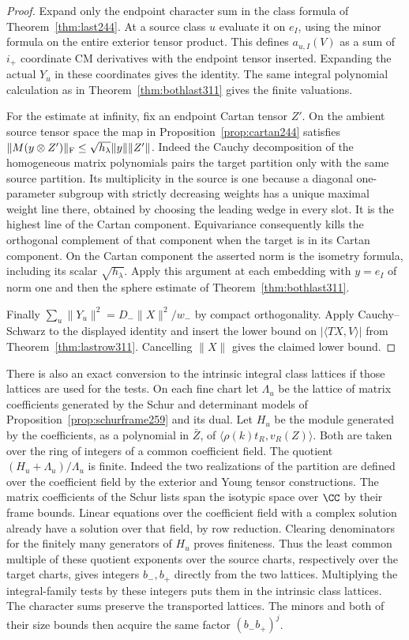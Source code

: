 \documentclass[a4paper,11pt]{article}
\theoremstyle{definition}
\theoremstyle{remark}
\numberwithin{equation}{section}
\begin{document}
\begin{proof}
Expand only the endpoint character sum in the class formula
of Theorem~\ref{thm:last244}. At a source class \(u\) evaluate
it on \(e_I\), using the minor formula on the entire exterior
tensor product. This defines \(a_{u,I}(V)\) as a sum of
\(i_+\) coordinate CM derivatives with the endpoint tensor
inserted. Expanding the actual \(Y_u\) in these coordinates
gives the identity. The same integral polynomial calculation
as in Theorem~\ref{thm:bothlast311} gives the finite valuations.

For the estimate at infinity, fix an endpoint Cartan tensor
\(Z'\). On the ambient source tensor space the map in
Proposition~\ref{prop:cartan244} satisfies
\(\|M(y\otimes Z')\|_{\rm F}\le
\sqrt{h_\lambda}\|y\|\|Z'\|\). Indeed the Cauchy decomposition
of the homogeneous matrix polynomials pairs the target
partition only with the same source partition. Its multiplicity
in the source is one because a diagonal one-parameter subgroup
with strictly decreasing weights
has a unique maximal weight line there, obtained by choosing
the leading wedge in every slot. It is the highest line of
the Cartan component. Equivariance consequently kills the
orthogonal complement of that component when the target is
in its Cartan component. On the Cartan component the asserted
norm is the isometry formula, including its scalar
\(\sqrt{h_\lambda}\). Apply this argument at each embedding
with \(y=e_I\) of norm one and then the sphere estimate of
Theorem~\ref{thm:bothlast311}.

Finally \(\sum_u\|Y_u\|^2=D_-\|X\|^2/w_-\) by compact
orthogonality. Apply Cauchy--Schwarz to the displayed identity
and insert the lower bound on \(|\langle TX,V\rangle|\) from
Theorem~\ref{thm:lastrow311}. Cancelling \(\|X\|\) gives the
claimed lower bound.
\end{proof}

There is also an exact conversion to the intrinsic integral
class lattices if those lattices are used for the tests.
On each fine chart let \(\Lambda_u\) be the lattice of matrix
coefficients generated by the Schur and determinant models of
Proposition~\ref{prop:schurframe259} and its dual. Let
\(H_u\) be the module generated by the coefficients, as a
polynomial in \(\bar Z\), of
\(\langle\rho(k)t_R,v_R(Z)\rangle\). Both are taken over the
ring of integers of a common coefficient field. The quotient
\((H_u+\Lambda_u)/\Lambda_u\) is finite. Indeed the two
realizations of the partition are defined over the coefficient
field by the exterior and Young tensor constructions. The
matrix coefficients of the Schur lists span the isotypic
space over \(\CC\) by their frame bounds. Linear equations
over the coefficient field with a complex solution already
have a solution over that field, by row reduction. Clearing
denominators for the finitely many generators of \(H_u\)
proves finiteness. Thus the least common multiple of these
quotient exponents over the source charts, respectively over
the target charts, gives integers \(b_-,b_+\) directly from
the two lattices. Multiplying the integral-family tests by
these integers puts them in the intrinsic class lattices.
The character sums preserve the transported lattices.
The minors and both of their size bounds then acquire
the same factor \((b_-b_+)^j\).
\end{document}
